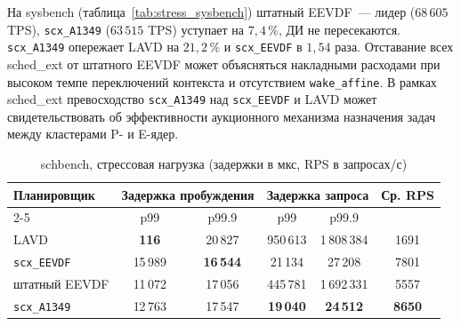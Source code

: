 \documentclass[14pt, oneside]{extbook}
\begin{document}
        На sysbench (таблица~\ref{tab:stress_sysbench})
        штатный EEVDF~--- лидер ($68\,605$ TPS),
        \texttt{scx\_A1349} ($63\,515$ TPS) уступает на
        $7{,}4$\,\%, ДИ не пересекаются. \texttt{scx\_A1349}
        опережает LAVD на $21{,}2$\,\% и \texttt{scx\_EEVDF}
        в $1{,}54$ раза. Отставание всех sched\_ext от
        штатного EEVDF может объясняться накладными расходами
        при высоком темпе переключений контекста и отсутствием
        \texttt{wake\_affine}. В рамках sched\_ext
        превосходство \texttt{scx\_A1349} над
        \texttt{scx\_EEVDF} и LAVD может свидетельствовать
        об эффективности аукционного механизма назначения
        задач между кластерами P- и E-ядер.

        \begin{table}[H]
                \centering
                \caption{schbench, стрессовая нагрузка (задержки в мкс, RPS в запросах/с)}
                \label{tab:stress_schbench}
                \vspace{0.4em}
                \begin{tabular}{|l|c|c|c|c|c|}
                        \hline
                        \multirow{2}{*}{Планировщик}
                                & \multicolumn{2}{c|}{Задержка пробуждения}
                                & \multicolumn{2}{c|}{Задержка запроса}
                                & \multirow{2}{*}{Ср. RPS} \\
                        \cline{2-5}
                                & p99 & p99.9 & p99 & p99.9 & \\
                        \hline
                        LAVD                & \textbf{116} & 20\,827          & 950\,613         & 1\,808\,384       & 1691 \\
                        \texttt{scx\_EEVDF} & 15\,989      & \textbf{16\,544} & 21\,134          & 27\,208           & 7801 \\
                        штатный EEVDF       & 11\,072      & 17\,056          & 445\,781         & 1\,692\,331       & 5557 \\
                        \texttt{scx\_A1349} & 12\,763      & 17\,547          & \textbf{19\,040} & \textbf{24\,512}  & \textbf{8650} \\
                        \hline
                \end{tabular}
        \end{table}
\end{document}
